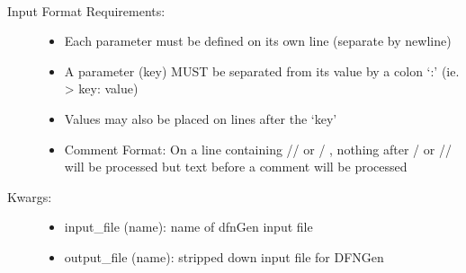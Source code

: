 \documentclass[letterpaper,10pt,english]{sphinxmanual}
\begin{document}
\begin{fulllineitems}
\label{\detokenize{pydfnworks:pydfnworks.gen_input.check_input}}~\begin{description}
\item[{Input Format Requirements:  }] \leavevmode\begin{itemize}
\item {} 
Each parameter must be defined on its own line (separate by newline)

\item {} 
A parameter (key) MUST be separated from its value by a colon ‘:’ (ie. \textendash{}\textgreater{} key: value)

\item {} 
Values may also be placed on lines after the ‘key’

\item {} 
Comment Format:  On a line containing  // or / \sphinxcode{*}, nothing after \sphinxcode{*} / or // will be processed  but text before a comment will be processed

\end{itemize}

\item[{Kwargs:}] \leavevmode\begin{itemize}
\item {} 
input\_file (name): name of dfnGen input file

\item {} 
output\_file (name): stripped down input file for DFNGen

\end{itemize}

\end{description}

\end{fulllineitems}

\label{\detokenize{pydfnworks:module-pydfnworks.distributions}}
\end{document}
